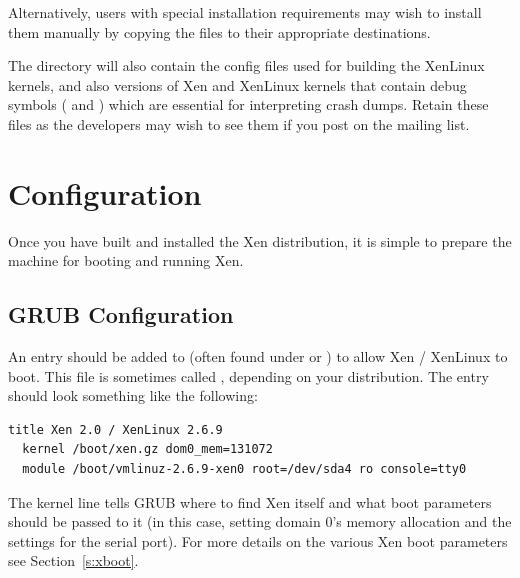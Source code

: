 \documentclass[11pt,twoside,final,openright]{report}
\begin{document}
Alternatively, users with special installation requirements may wish
to install them manually by copying the files to their appropriate
destinations.


The  directory will also contain the config files
used for building the XenLinux kernels, and also versions of Xen and
XenLinux kernels that contain debug symbols ( and
) which are essential for interpreting crash
dumps.  Retain these files as the developers may wish to see them if
you post on the mailing list.





\section{Configuration}
\label{s:configure}
Once you have built and installed the Xen distribution, it is 
simple to prepare the machine for booting and running Xen. 

\subsection{GRUB Configuration}

An entry should be added to  (often found under
 or ) to allow Xen / XenLinux to boot.
This file is sometimes called , depending on your
distribution.  The entry should look something like the following:

{\small
\begin{verbatim}
title Xen 2.0 / XenLinux 2.6.9
  kernel /boot/xen.gz dom0_mem=131072
  module /boot/vmlinuz-2.6.9-xen0 root=/dev/sda4 ro console=tty0
\end{verbatim}
}

The kernel line tells GRUB where to find Xen itself and what boot
parameters should be passed to it (in this case, setting domain 0's
memory allocation and the settings for the serial port). For more
details on the various Xen boot parameters see Section~\ref{s:xboot}. 
\end{document}
